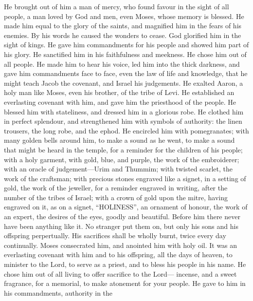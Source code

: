  He brought out of him a man of mercy, who found favour in
the sight of all people, a man loved by God and men, even Moses, whose
memory is blessed.  He made him equal to the glory of the
saints, and magnified him in the fears of his enemies.  By
his words he caused the wonders to cease. God glorified him in the sight
of kings. He gave him commandments for his people and showed him part of
his glory.  He sanctified him in his faithfulness and
meekness. He chose him out of all people.  He made him to
hear his voice, led him into the thick darkness, and gave him
commandments face to face, even the law of life and knowledge, that he
might teach Jacob the covenant, and Israel his judgements. 
He exalted Aaron, a holy man like Moses, even his brother, of the tribe
of Levi.  He established an everlasting covenant with him,
and gave him the priesthood of the people. He blessed him with
stateliness, and dressed him in a glorious robe.  He clothed
him in perfect splendour, and strengthened him with symbols of
authority: the linen trousers, the long robe, and the ephod.
 He encircled him with pomegranates; with many golden bells
around him, to make a sound as he went, to make a sound that might be
heard in the temple, for a reminder for the children of his people;
 with a holy garment, with gold, blue, and purple, the work
of the embroiderer; with an oracle of judgement---Urim and Thummim;
 with twisted scarlet, the work of the craftsman; with
precious stones engraved like a signet, in a setting of gold, the work
of the jeweller, for a reminder engraved in writing, after the number of
the tribes of Israel;  with a crown of gold upon the mitre,
having engraved on it, as on a signet, ``HOLINESS'', an ornament of
honour, the work of an expert, the desires of the eyes, goodly and
beautiful.  Before him there never have been anything like
it. No stranger put them on, but only his sons and his offspring
perpertually.  His sacrifices shall be wholly burnt, twice
every day continually.  Moses consecrated him, and anointed
him with holy oil. It was an everlasting covenant with him and to his
offspring, all the days of heaven, to minister to the Lord, to serve as
a priest, and to bless his people in his name.  He chose
him out of all living to offer sacrifice to the Lord--- incense, and a
sweet fragrance, for a memorial, to make atonement for your people.
 He gave to him in his commandments, authority in the
